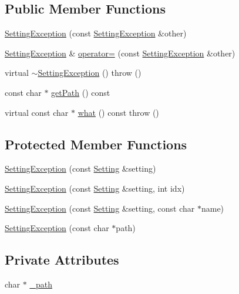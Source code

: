 \subsection*{Public Member Functions}
\begin{DoxyCompactItemize}
\item 
\hyperlink{classlibconfig_1_1SettingException_a22ad32bab261aa1a6a17e4e1783240e4}{Setting\-Exception} (const \hyperlink{classlibconfig_1_1SettingException}{Setting\-Exception} \&other)
\item 
\hyperlink{classlibconfig_1_1SettingException}{Setting\-Exception} \& \hyperlink{classlibconfig_1_1SettingException_aec6caeb252c238bde272e5050c6b881f}{operator=} (const \hyperlink{classlibconfig_1_1SettingException}{Setting\-Exception} \&other)
\item 
virtual \hyperlink{classlibconfig_1_1SettingException_a430c62b735c729be8b1478dae91b59cd}{$\sim$\-Setting\-Exception} ()  throw ()
\item 
const char $\ast$ \hyperlink{classlibconfig_1_1SettingException_a3aa229dde3459dbd18d9598f8d1bede4}{get\-Path} () const 
\item 
virtual const char $\ast$ \hyperlink{classlibconfig_1_1SettingException_aead416e6b1f46683804fff8f4649df05}{what} () const   throw ()
\end{DoxyCompactItemize}
\subsection*{Protected Member Functions}
\begin{DoxyCompactItemize}
\item 
\hyperlink{classlibconfig_1_1SettingException_a8e64e378f22317a3daa5824071c38e89}{Setting\-Exception} (const \hyperlink{classlibconfig_1_1Setting}{Setting} \&setting)
\item 
\hyperlink{classlibconfig_1_1SettingException_a6ed0f32d95fe0730c8a10b2a12a12d7a}{Setting\-Exception} (const \hyperlink{classlibconfig_1_1Setting}{Setting} \&setting, int idx)
\item 
\hyperlink{classlibconfig_1_1SettingException_adfd98e2d09b2689884b9349968ea3477}{Setting\-Exception} (const \hyperlink{classlibconfig_1_1Setting}{Setting} \&setting, const char $\ast$name)
\item 
\hyperlink{classlibconfig_1_1SettingException_a9e695af9dc4098bed2091f2753b79cf1}{Setting\-Exception} (const char $\ast$path)
\end{DoxyCompactItemize}
\subsection*{Private Attributes}
\begin{DoxyCompactItemize}
\item 
char $\ast$ \hyperlink{classlibconfig_1_1SettingException_a6ff6948c979fb2af8e940741416b6d89}{\-\_\-path}
\end{DoxyCompactItemize}
